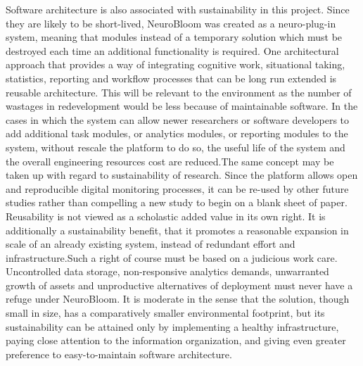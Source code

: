 \documentclass[12pt,a4paper]{report}
\begin{document}
Software architecture is also associated with sustainability in this project. Since they are likely to be short-lived, NeuroBloom was created as a neuro-plug-in system, meaning that modules instead of a temporary solution which must be destroyed each time an additional functionality is required. One architectural approach that provides a way of integrating cognitive work, situational taking, statistics, reporting and workflow processes that can be long run extended is reusable architecture. This will be relevant to the environment as the number of wastages in redevelopment would be less because of maintainable software. In the cases in which the system can allow newer researchers or software developers to add additional task modules, or analytics modules, or reporting modules to the system, without rescale the platform to do so, the useful life of the system and the overall engineering resources cost are reduced.The same concept may be taken up with regard to sustainability of research. Since the platform allows open and reproducible digital monitoring processes, it can be re-used by other future studies rather than compelling a new study to begin on a blank sheet of paper. Reusability is not viewed as a scholastic added value in its own right. It is additionally a sustainability benefit, that it promotes a reasonable expansion in scale of an already existing system, instead of redundant effort and infrastructure.Such a right of course must be based on a judicious work care. Uncontrolled data storage, non-responsive analytics demands, unwarranted growth of assets and unproductive alternatives of deployment must never have a refuge under NeuroBloom. It is moderate in the sense that the solution, though small in size, has a comparatively smaller environmental footprint, but its sustainability can be attained only by implementing a healthy infrastructure, paying close attention to the information organization, and giving even greater preference to easy-to-maintain software architecture.
\end{document}

